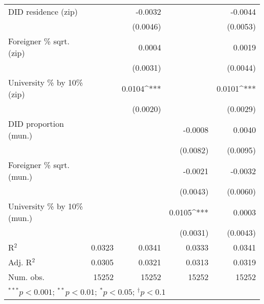 \begin{tabular}{l D{.}{.}{5.7} D{.}{.}{5.11} D{.}{.}{5.11} D{.}{.}{5.11}}
DID residence (zip)               &              & -0.0032           &                   & -0.0044           \\
                                  &              & (0.0046)          &                   & (0.0053)          \\
Foreigner \% sqrt. (zip)          &              & 0.0004            &                   & 0.0019            \\
                                  &              & (0.0031)          &                   & (0.0044)          \\
University \% by 10\% (zip)       &              & 0.0104^{***}      &                   & 0.0101^{***}      \\
                                  &              & (0.0020)          &                   & (0.0029)          \\
DID proportion (mun.)             &              &                   & -0.0008           & 0.0040            \\
                                  &              &                   & (0.0082)          & (0.0095)          \\
Foreigner \% sqrt. (mun.)         &              &                   & -0.0021           & -0.0032           \\
                                  &              &                   & (0.0043)          & (0.0060)          \\
University \% by 10\% (mun.)      &              &                   & 0.0105^{***}      & 0.0003            \\
                                  &              &                   & (0.0031)          & (0.0043)          \\
\midrule
R$^2$                             & 0.0323       & 0.0341            & 0.0333            & 0.0341            \\
Adj. R$^2$                        & 0.0305       & 0.0321            & 0.0313            & 0.0319            \\
Num. obs.                         & 15252        & 15252             & 15252             & 15252             \\
\bottomrule
{}
\end{tabular}
